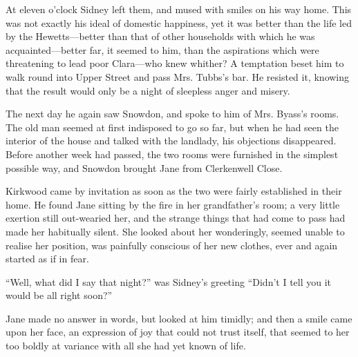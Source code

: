 At eleven o'clock Sidney left them, and mused with smiles on his way
home. This was not exactly his ideal of domestic happiness, yet it was
better than the life led by the Hewetts---better than that of other
households with which he was acquainted---better far, it seemed to him,
than the aspirations which were threatening to lead poor Clara---who
knew whither? A temptation beset him to walk round into Upper Street and
pass Mrs. Tubbs's bar. He resisted it, knowing that the result would
only be a night of sleepless anger and misery.

The next day he again saw Snowdon, and spoke to him of Mrs. Byass's
rooms. The old man seemed at first indisposed to go so far, but when he
had seen the interior of the house and talked with the landlady, his
objections disappeared. Before another week had passed, the two rooms
were furnished {}in the simplest possible way, and Snowdon brought Jane
from Clerkenwell Close.

Kirkwood came by invitation as soon as the two were fairly established
in their home. He found Jane sitting by the fire in her grandfather's
room; a very little exertion still out-wearied her, and the strange
things that had come to pass had made her habitually silent. She looked
about her wonderingly, seemed unable to realise her position, was
painfully conscious of her new clothes, ever and again started as if in
fear.

``Well, what did I say that night?'' was Sidney's greeting ``Didn't I
tell you it would be all right soon?''

Jane made no answer in words, but looked at him timidly; and then a
smile came upon her face, an expression of joy that could not trust
itself, that seemed to her too boldly at variance with all she had yet
known of life.

